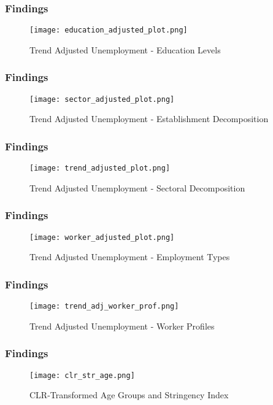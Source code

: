 \documentclass[
	11pt, %
]{beamer}
\begin{document}
\begin{frame}
    \frametitle{Findings}
    \begin{figure}
            \centering
            \texttt{[image: education\_adjusted\_plot.png]}
            \caption{Trend Adjusted Unemployment - Education Levels}
            \label{fig:trend_adj_educ}
        \end{figure}
\end{frame}

\begin{frame}
    \frametitle{Findings}
    \begin{figure}
        \centering
        \texttt{[image: sector\_adjusted\_plot.png]}
        \caption{Trend Adjusted Unemployment - Establishment Decomposition}
        \label{fig:trend_adj_pubpriv}
    \end{figure}
\end{frame}

\begin{frame}
    \frametitle{Findings}
    \begin{figure}
        \centering
        \texttt{[image: trend\_adjusted\_plot.png]}
        \caption{Trend Adjusted Unemployment - Sectoral Decomposition}
        \label{fig:trend_adj_threesectors}
    \end{figure}
\end{frame}

\begin{frame}
    \frametitle{Findings}
    \begin{figure}
        \centering
        \texttt{[image: worker\_adjusted\_plot.png]}
        \caption{Trend Adjusted Unemployment - Employment Types}
        \label{fig:trend_adj_employment}
    \end{figure}
\end{frame}

\begin{frame}
    \frametitle{Findings}
    \begin{figure}
        \centering
        \texttt{[image: trend\_adj\_worker\_prof.png]}
        \caption{Trend Adjusted Unemployment - Worker Profiles}
        \label{fig:trend_adj_workprof}
    \end{figure}
\end{frame}

\begin{frame}
    \frametitle{Findings}
    \begin{figure}
        \centering
        \texttt{[image: clr\_str\_age.png]}
        \caption{CLR-Transformed Age Groups and Stringency Index}
        \label{fig:clr_str_age}
    \end{figure}
\end{frame}
\end{document}
